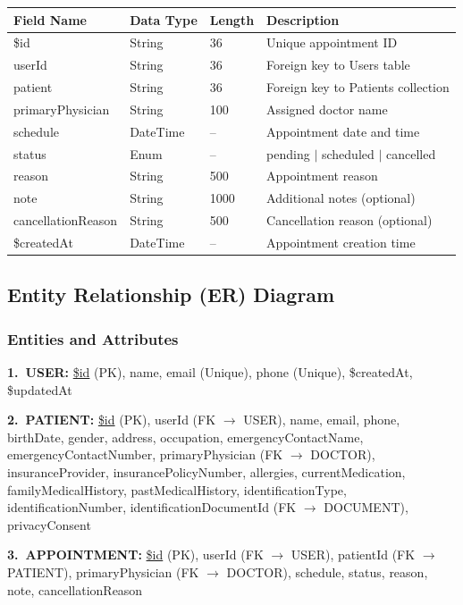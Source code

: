 \documentclass[11pt,a4paper]{article}
\begin{document}
\begin{longtable}{|p{3.5cm}|p{2cm}|p{1.5cm}|p{6cm}|}
\hline
\textbf{Field Name} & \textbf{Data Type} & \textbf{Length} & \textbf{Description} \\
\hline
\$id & String & 36 & Unique appointment ID \\
userId & String & 36 & Foreign key to Users table \\
patient & String & 36 & Foreign key to Patients collection \\
primaryPhysician & String & 100 & Assigned doctor name \\
schedule & DateTime & -- & Appointment date and time \\
status & Enum & -- & pending $|$ scheduled $|$ cancelled \\
reason & String & 500 & Appointment reason \\
note & String & 1000 & Additional notes (optional) \\
cancellationReason & String & 500 & Cancellation reason (optional) \\
\$createdAt & DateTime & -- & Appointment creation time \\
\hline
\end{longtable}

\subsection{Entity Relationship (ER) Diagram}

\subsubsection{Entities and Attributes}

\textbf{1.\ USER:} \underline{\$id} (PK), name, email (Unique), phone (Unique), \$createdAt, \$updatedAt

\textbf{2.\ PATIENT:} \underline{\$id} (PK), userId (FK $\rightarrow$ USER), name, email, phone, birthDate, gender, address, occupation, emergencyContactName, emergencyContactNumber, primaryPhysician (FK $\rightarrow$ DOCTOR), insuranceProvider, insurancePolicyNumber, allergies, currentMedication, familyMedicalHistory, pastMedicalHistory, identificationType, identificationNumber, identificationDocumentId (FK $\rightarrow$ DOCUMENT), privacyConsent

\textbf{3.\ APPOINTMENT:} \underline{\$id} (PK), userId (FK $\rightarrow$ USER), patientId (FK $\rightarrow$ PATIENT), primaryPhysician (FK $\rightarrow$ DOCTOR), schedule, status, reason, note, cancellationReason
\end{document}
